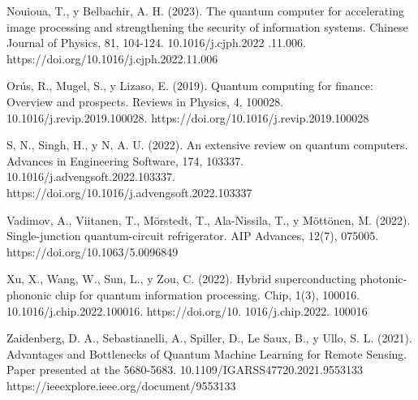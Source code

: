 \documentclass[twoside]{article}
\begin{document}
Nouioua, T., y Belbachir, A. H. (2023). The quantum computer for accelerating image processing and strengthening the security of information systems. Chinese Journal of Physics, 81, 104-124. 10.1016/j.cjph.2022
.11.006. 
https://doi.org/10.1016/j.cjph.2022.11.006

Orús, R., Mugel, S., y Lizaso, E. (2019). Quantum computing for finance: Overview and prospects. Reviews in Physics, 4, 100028. 10.1016/j.revip.2019.100028.
https://doi.org/10.1016/j.revip.2019.100028

S, N., Singh, H., y N, A. U. (2022). An extensive review on quantum computers. Advances in Engineering Software, 174, 103337. 10.1016/j.advengsoft.2022.103337.
https://doi.org/10.1016/j.advengsoft.2022.103337

Vadimov, A., Viitanen, T., Mörstedt, T., Ala-Nissila, T., y Möttönen, M. (2022). Single-junction quantum-circuit refrigerator. AIP Advances, 12(7), 075005. https://doi.org/10.1063/5.0096849

Xu, X., Wang, W., Sun, L., y Zou, C. (2022). Hybrid superconducting photonic-phononic chip for quantum information processing. Chip, 1(3), 100016. 10.1016/j.chip.2022.100016.
https://doi.org/10.
1016/j.chip.2022.
100016

Zaidenberg, D. A., Sebastianelli, A., Spiller, D., Le Saux, B., y Ullo, S. L. (2021).  Advantages and Bottlenecks of Quantum Machine Learning for Remote Sensing. Paper presented at the 5680-5683. 10.1109/IGARSS47720.2021.9553133 https://ieeexplore.ieee.org/document/9553133
\end{document}
